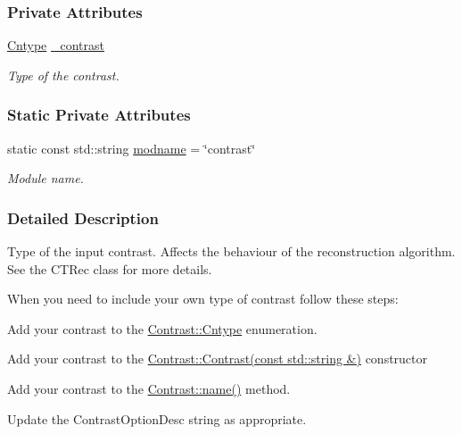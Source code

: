 \subsubsection*{Private Attributes}
\begin{DoxyCompactItemize}
\item 
\hyperlink{classContrast_a99b7c9b3f4f10b92a6db24002adac72f}{Cntype} \hyperlink{classContrast_ac333f4983aae5b900d5cc57f4ff51453}{\_\-contrast}
\begin{DoxyCompactList}\small\item\em Type of the contrast. \item\end{DoxyCompactList}\end{DoxyCompactItemize}
\subsubsection*{Static Private Attributes}
\begin{DoxyCompactItemize}
\item 
static const std::string \hyperlink{classContrast_ad080deac5626be04e6f0b0148564cd56}{modname} = \char`\"{}contrast\char`\"{}
\begin{DoxyCompactList}\small\item\em Module name. \item\end{DoxyCompactList}\end{DoxyCompactItemize}


\subsubsection{Detailed Description}
Type of the input contrast. Affects the behaviour of the reconstruction algorithm. See the CTRec class for more details.

When you need to include your own type of contrast follow these steps:
\begin{DoxyEnumerate}
\item Add your contrast to the \hyperlink{classContrast_a99b7c9b3f4f10b92a6db24002adac72f}{Contrast::Cntype} enumeration.
\item Add your contrast to the \hyperlink{classContrast_a4e55b92f5b8edb836df5eb8dca5a19e2}{Contrast::Contrast(const std::string \&)} constructor
\item Add your contrast to the \hyperlink{classContrast_a759690bfe7dbf3ef5b416ceb6767183f}{Contrast::name()} method.
\item Update the ContrastOptionDesc string as appropriate. 
\end{DoxyEnumerate}

